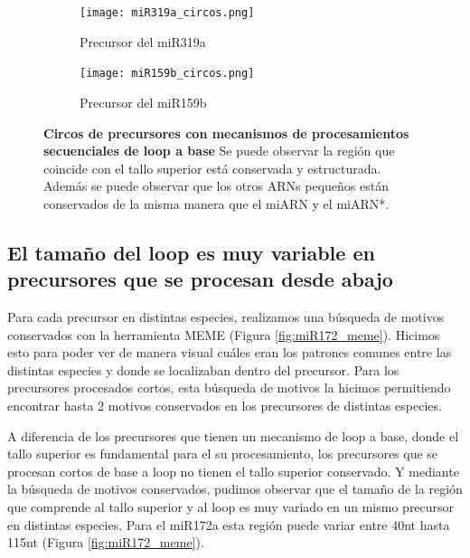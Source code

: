 \begin{landscape}
	\begin{figure}
	\centering
	\begin{subfigure}{.75\textwidth}
 \centering
 \texttt{[image: miR319a\_circos.png]}
 \caption{Precursor del miR319a}
 \label{subfig:miR319a_circos}
	\end{subfigure}%
	\begin{subfigure}{.75\textwidth}
 \centering
 \texttt{[image: miR159b\_circos.png]}
 \caption{Precursor del miR159b}
 \label{subfig:miR159b_circos}
	\end{subfigure}
	\caption[Circos de precursores con mecanismos de procesamientos secuenciales de loop a base]{
			\textbf{Circos de precursores con mecanismos de procesamientos secuenciales de loop a base}
            Se puede observar la región que coincide con el tallo superior está conservada y estructurada.
            Además se puede observar que los otros ARNs pequeños están conservados de la misma manera que el miARN y el miARN*.
   }
	\label{fig:seqLTB_circos}
	\end{figure}
\end{landscape}


\subsection{El tamaño del loop es muy variable en precursores que se procesan desde abajo}

Para cada precursor en distintas especies, realizamos una búsqueda de motivos conservados con la herramienta MEME \citep{pmid22115189} (Figura \ref{fig:miR172_meme}).
Hicimos esto para poder ver de manera visual cuáles eran los patrones comunes entre las distintas especies y donde se localizaban dentro del precursor.
Para los precursores procesados cortos, esta búsqueda de motivos la hicimos permitiendo encontrar hasta 2 motivos conservados en los precursores de distintas especies.

A diferencia de los precursores que tienen un mecanismo de loop a base, donde el tallo superior es fundamental para el su procesamiento, los precursores que se procesan cortos de base a loop no tienen el tallo superior conservado.
Y mediante la búsqueda de motivos conservados, pudimos observar que el tamaño de la región que comprende al tallo superior y al loop es muy variado en un mismo precursor en distintas especies.
Para el miR172a esta región puede variar entre 40nt hasta 115nt (Figura \ref{fig:miR172_meme}).

